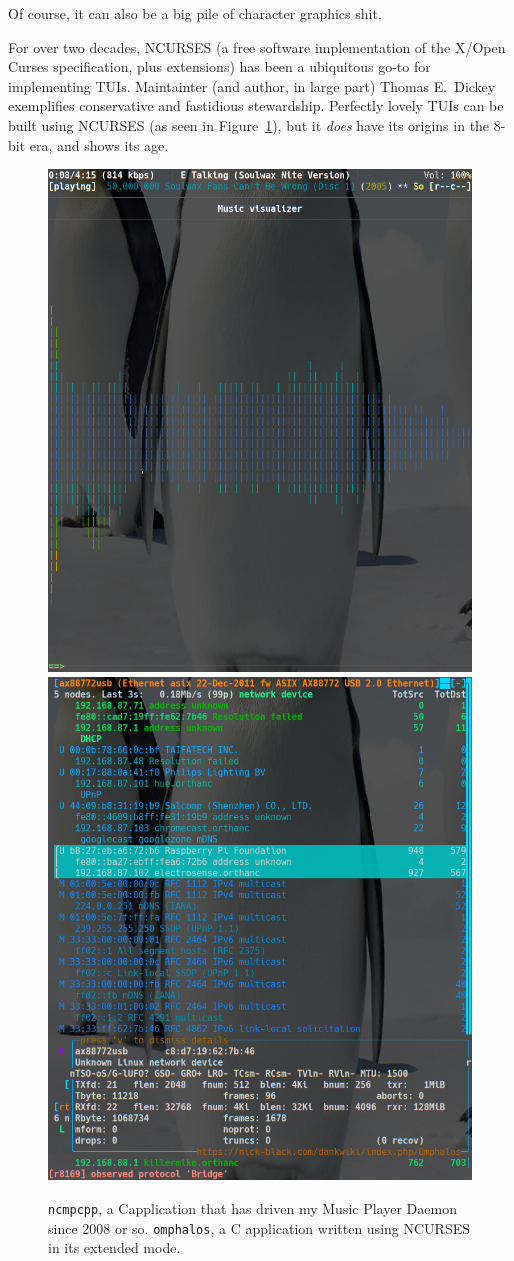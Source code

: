 \documentclass[letterpaper,10pt]{article}
\newcommand\CC{C\nolinebreak\hspace{-.05em}\raisebox{.4ex}{\relsize{-3}{\textbf{+}}}\nolinebreak\hspace{-.10em}\raisebox{.4ex}{\relsize{-3}{\textbf{+}}}\hspace{.2em}}
\begin{document}
Of course, it can also be a big pile of character graphics shit.

For over two decades, NCURSES (a free software implementation of the X/Open Curses\cite{cursesosi}
specification, plus extensions\cite{ncursesfaq}) has been a ubiquitous go-to for implementing
TUIs. Maintainter (and author, in large part) Thomas E.\ Dickey
exemplifies conservative and fastidious stewardship. Perfectly lovely TUIs can
be built using NCURSES (as seen in Figure~\ref{fig:ncurses-tuis}), but it \textit{does}
have its origins in the 8-bit era, and shows its age.

\begin{figure}[!hbtp]
  \centering
    \includegraphics[width=.4\linewidth]{media/tui-ncmpcpp.png}
    \hfill
    \includegraphics[width=.4\linewidth]{media/tui-omphalos.png}
    \caption[NCURSES TUIs: Ncmpcpp and Omphalos.]
    {\texttt{ncmpcpp}, a \CC application
      that has driven my Music Player Daemon since 2008 or so.
      \texttt{omphalos}, a C application
      written using NCURSES in its extended mode.}
  \label{fig:ncurses-tuis}
\end{figure}
\end{document}
